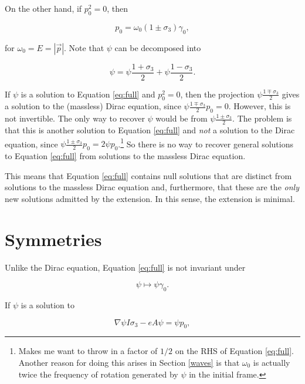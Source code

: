 \documentclass{article}
\begin{document}
   On the other hand, if $p_0^2 = 0$, then

  \begin{equation}
    p_0 = \omega_0 (1 \pm \sigma_3) \gamma_0, \label{eq:massless}
  \end{equation}

  for $\omega_0 = E = |\vec p|$. Note that $\psi$ can be decomposed into 

  \begin{equation}
    \psi = \psi \frac{1 + \sigma_3}{2} + \psi \frac{1 - \sigma_3}{2}.
  \end{equation}

  If $\psi$ is a solution to Equation \ref{eq:full} and $p_0^2 = 0$, then the projection $\psi \frac{1 \mp \sigma_3}{2}$ gives a solution to the (massless) Dirac equation, since $\psi \frac{1 \mp \sigma_3}{2} p_0 = 0$. However, this is not invertible. The only way to recover $\psi$ would be from $\psi \frac{1 \pm \sigma_3}{2}$. The problem is that this is another solution to Equation \ref{eq:full} and \emph{not} a solution to the Dirac equation, since $\psi \frac{1 \pm \sigma_3}{2} p_0 = 2 \psi p_0$.\footnote{Makes me want to throw in a factor of $1/2$ on the RHS of Equation \ref{eq:full}. Another reason for doing this arises in Section \ref{waves} is that $\omega_0$ is actually twice the frequency of rotation generated by $\psi$ in the initial frame.} So there is no way to recover general solutions to Equation \ref{eq:full} from solutions to the massless Dirac equation. 

  This means that Equation \ref{eq:full} contains null solutions that are distinct from solutions to the massless Dirac equation and, furthermore, that these are the \emph{only} new solutions admitted by the extension. In this sense, the extension is minimal.

  \section{Symmetries} \label{symmetries}

  Unlike the Dirac equation, Equation \ref{eq:full} is not invariant under

  \begin{equation}
    \psi \mapsto \psi \gamma_0.\label{eq:g0conjugation}
  \end{equation}

  If $\psi$ is a solution to

  \begin{equation}
    \nabla \psi I \sigma_3 - e A \psi = \psi p_0,\label{eq:plus}
  \end{equation}
\end{document}
